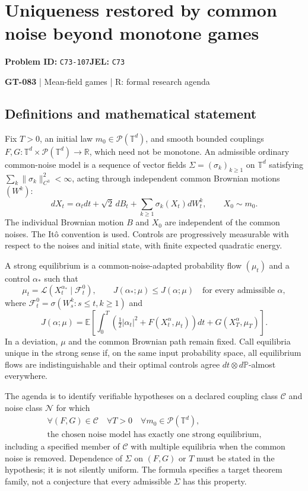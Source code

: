 \documentclass[11pt,a4paper]{article}
\begin{document}
\section*{Uniqueness restored by common noise beyond monotone games}
\textbf{Problem ID:} \texttt{C73-107}\quad \textbf{JEL:} \texttt{C73}\par
\label{problem:OP-0213}
\label{game:GT-083}
{\sffamily\small\color{muted}
{\small\textbf{GT-083} | Mean-field games | R: formal research agenda\par}
\par}
\subsection*{Definitions and mathematical statement}
Fix $T>0$, an initial law $m_0\in\mathcal P(\mathbb T^d)$, and smooth bounded couplings $F,G:\mathbb T^d\times\mathcal P(\mathbb T^d)\to\mathbb R$, which need not be monotone. An admissible ordinary common-noise model is a sequence of vector fields $\Sigma=(\sigma_k)_{k\geq1}$ on $\mathbb T^d$ satisfying $\sum_k\|\sigma_k\|_{C^3}^2<\infty$, acting through independent common Brownian motions $(W^k)$:
\[
 dX_t=\alpha_tdt+\sqrt2\,dB_t+\sum_{k\geq1}\sigma_k(X_t)dW_t^k,
 \qquad X_0\sim m_0.
\]
The individual Brownian motion $B$ and $X_0$ are independent of the common noises. The It\^o convention is used. Controls are progressively measurable with respect to the noises and initial state, with finite expected quadratic energy.

A strong equilibrium is a common-noise-adapted probability flow $(\mu_t)$ and a control $\alpha_*$ such that
\[
 \mu_t=\mathcal L(X_t^{\alpha_*}\mid\mathcal F_t^0),\qquad
 J(\alpha_*;\mu)\leq J(\alpha;\mu)\quad\text{for every admissible }\alpha,
\]
where $\mathcal F_t^0=\sigma(W_s^k:s\leq t,k\geq1)$ and
\[
 J(\alpha;\mu)=\mathbb E\!\left[\int_0^T
 \left(\tfrac12|\alpha_t|^2+F(X_t^\alpha,\mu_t)\right)dt
 +G(X_T^\alpha,\mu_T)\right].
\]
In a deviation, $\mu$ and the common Brownian path remain fixed. Call equilibria unique in the strong sense if, on the same input probability space, all equilibrium flows are indistinguishable and their optimal controls agree $dt\otimes d\mathbb P$-almost everywhere.

The agenda is to identify verifiable hypotheses on a declared coupling class $\mathcal C$ and noise class $\mathcal N$ for which
\[
 \begin{gathered}
 \forall (F,G)\in\mathcal C\quad\forall T>0\quad
 \forall m_0\in\mathcal P(\mathbb T^d),\\
 \text{the chosen noise model has exactly one strong equilibrium},
 \end{gathered}
\]
including a specified member of $\mathcal C$ with multiple equilibria when the common noise is removed. Dependence of $\Sigma$ on $(F,G)$ or $T$ must be stated in the hypothesis; it is not silently uniform. The formula specifies a target theorem family, not a conjecture that every admissible $\Sigma$ has this property.
\end{document}
